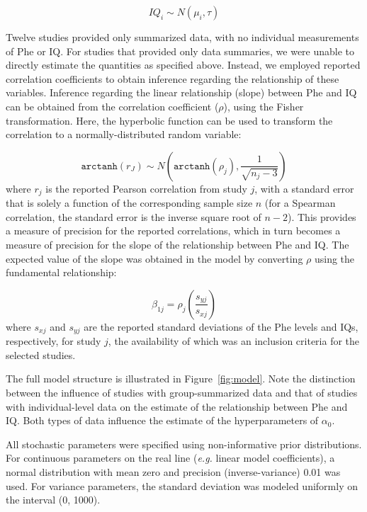 \documentclass{svjour3}                     %
\begin{document}
\[
    IQ_i \sim N(\mu_i,\tau)
\]

Twelve studies provided only summarized data, with no individual measurements of Phe or IQ. For studies that provided only data summaries, we were unable to directly estimate the quantities as specified above. Instead, we employed reported correlation coefficients to obtain inference regarding the relationship of these variables. Inference regarding the linear relationship (slope) between Phe and IQ can be obtained from the correlation coefficient ($\rho$), using the Fisher transformation. Here, the hyperbolic function can be used to transform the correlation to a normally-distributed random variable:

\[
    \texttt{arctanh}(r_J) \sim N \left( \texttt{arctanh}(\rho_j), \frac{1}{\sqrt{n_j - 3}} \right)
\]
where $r_j$ is the reported Pearson correlation from study $j$, with a standard error that is solely a function of the corresponding sample size $n$ (for a Spearman correlation, the standard error is the inverse square root of $n-2$). This provides a measure of precision for the reported correlations, which in turn becomes a measure of precision for the slope of the relationship between Phe and IQ. The expected value of the slope was obtained in the model by converting $\rho$ using the fundamental relationship:

\[
    \beta_{1j} = \rho_j \left( \frac{s_{yj}}{s_{xj}} \right)
\]
where $s_{xj}$ and $s_{yj}$ are the reported standard deviations of the Phe levels and IQs, respectively, for study $j$, the availability of which was an inclusion criteria for the selected studies.

The full model structure is illustrated in Figure~\ref{fig:model}. Note the distinction between the influence of studies with group-summarized data and that of studies with individual-level data on the estimate of the relationship between Phe and IQ. Both types of data influence the estimate of the hyperparameters of $\alpha_0$.

All stochastic parameters were specified using non-informative prior distributions. For continuous parameters on the real line (\emph{e.g.} linear model coefficients), a normal distribution with mean zero and precision (inverse-variance) 0.01 was used. For variance parameters, the standard deviation was modeled uniformly on the interval (0, 1000).
\end{document}
